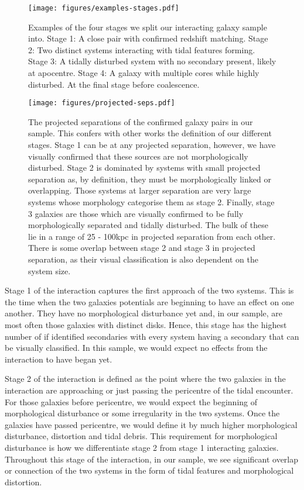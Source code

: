 \documentclass[fleqn,usenatbib]{mnras}
\begin{document}
\begin{figure}
    \centering
    \texttt{[image: figures/examples-stages.pdf]}
    \caption{Examples of the four stages we split our interacting galaxy sample into. Stage 1: A close pair with confirmed redshift matching. Stage 2: Two distinct systems interacting with tidal features forming. Stage 3: A tidally disturbed system with no secondary present, likely at apocentre. Stage 4: A galaxy with multiple cores while highly disturbed. At the final stage before coalescence.}
    \label{fig:stages}
\end{figure}

\begin{figure*}
    \centering
    \texttt{[image: figures/projected-seps.pdf]}
    \caption{The projected separations of the confirmed galaxy pairs in our sample. This confers with other works the definition of our different stages. Stage 1 can be at any projected separation, however, we have visually confirmed that these sources are not morphologically disturbed. Stage 2 is dominated by systems with small projected separation as, by definition, they must be morphologically linked or overlapping. Those systems at larger separation are very large systems whose morphology categorise them as stage 2. Finally, stage 3 galaxies are those which are visually confirmed to be fully morphologically separated and tidally disturbed. The bulk of these lie in a range of 25 - 100kpc in projected separation from each other. There is some overlap between stage 2 and stage 3 in projected separation, as their visual classification is also dependent on the system size.}
    \label{fig:proj-seps}
\end{figure*}

Stage 1 of the interaction captures the first approach of the two systems. This is the time when the two galaxies potentials are beginning to have an effect on one another. They have no morphological disturbance yet and, in our sample, are most often those galaxies with distinct disks. Hence, this stage has the highest number of if identified secondaries with every system having a secondary that can be visually classified. In this sample, we would expect no effects from the interaction to have began yet. 

Stage 2 of the interaction is defined as the point where the two galaxies in the interaction are approaching or just passing the pericentre of the tidal encounter. For those galaxies before pericentre, we would expect the beginning of morphological disturbance or some irregularity in the two systems. Once the galaxies have passed pericentre, we would define it by much higher morphological disturbance, distortion and tidal debris. This requirement for morphological disturbance is how we differentiate stage 2 from stage 1 interacting galaxies. Throughout this stage of the interaction, in our sample, we see significant overlap or connection of the two systems in the form of tidal features and morphological distortion.
\end{document}
